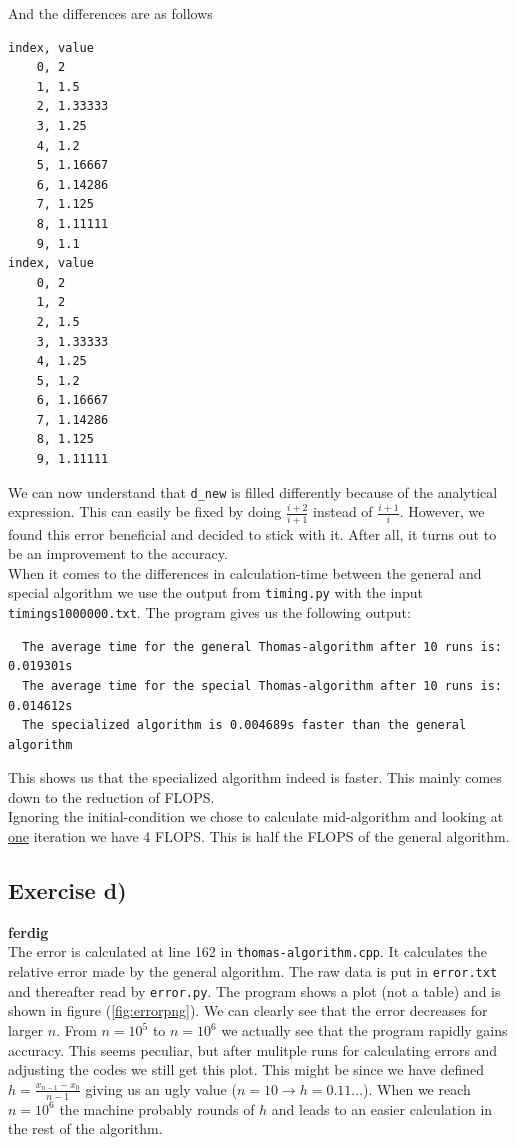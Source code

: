 \documentclass{article}
\begin{document}
  And the differences are as follows

  \begin{verbatim}
index, value
    0, 2
    1, 1.5
    2, 1.33333
    3, 1.25
    4, 1.2
    5, 1.16667
    6, 1.14286
    7, 1.125
    8, 1.11111
    9, 1.1
index, value
    0, 2
    1, 2
    2, 1.5
    3, 1.33333
    4, 1.25
    5, 1.2
    6, 1.16667
    7, 1.14286
    8, 1.125
    9, 1.11111
  \end{verbatim}

  We can now understand that \texttt{d\_new} is filled differently because of the analytical expression. This can easily be fixed by doing $\frac{i+2}{i+1}$ instead of $\frac{i+1}{i}$. However, we found this error beneficial and decided to stick with it. After all, it turns out to be an improvement to the accuracy. \\

  When it comes to the differences in calculation-time between the general and special algorithm we use the output from \texttt{timing.py} with the input \texttt{timings1000000.txt}. The program gives us the following output:

  \begin{verbatim}
  The average time for the general Thomas-algorithm after 10 runs is: 0.019301s
  The average time for the special Thomas-algorithm after 10 runs is: 0.014612s
  The specialized algorithm is 0.004689s faster than the general algorithm
  \end{verbatim}

  This shows us that the specialized algorithm indeed is faster. This mainly comes down to the reduction of FLOPS.\\

  Ignoring the initial-condition we chose to calculate mid-algorithm and looking at \underline{one} iteration we have 4 FLOPS. This is half the FLOPS of the general algorithm.

  \subsection{Exercise d)} \label{sec:Results d)}

  {\bf ferdig} \\

  The error is calculated at line 162 in \texttt{thomas-algorithm.cpp}. It calculates the relative error made by the general algorithm. The raw data is put in \texttt{error.txt} and thereafter read by \texttt{error.py}. The program shows a plot (not a table) and is shown in figure (\ref{fig:errorpng}). We can clearly see that the error decreases for larger $n$. From $n=10^5$ to $n=10^6$ we actually see that the program rapidly gains accuracy. This seems peculiar, but after mulitple runs for calculating errors and adjusting the codes we still get this plot. This might be since we have defined $h=\frac{x_{n-1}-x_0}{n-1}$ giving us an ugly value ($n=10 \rightarrow{} h=0.11 \hdots$). When we reach $n=10^6$ the machine probably rounds of $h$ and leads to an easier calculation in the rest of the algorithm.\\
\end{document}
